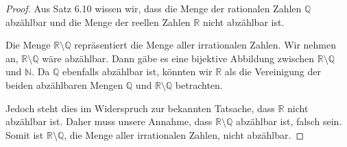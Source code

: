 \documentclass{article}
\theoremstyle{definition}
\theoremstyle{remark}
\begin{document}
\begin{proof}
	Aus Satz 6.10 wissen wir, dass die Menge der rationalen Zahlen \( \mathbb{Q} \) abzählbar und die Menge der reellen Zahlen \( \mathbb{R} \) nicht abzählbar ist.

	Die Menge \( \mathbb{R} \setminus \mathbb{Q} \) repräsentiert die Menge aller irrationalen Zahlen. Wir nehmen an, \( \mathbb{R} \setminus \mathbb{Q} \) wäre abzählbar. Dann gäbe es eine bijektive Abbildung zwischen \( \mathbb{R} \setminus \mathbb{Q} \) und \( \mathbb{N} \). Da \( \mathbb{Q} \) ebenfalls abzählbar ist, könnten wir \( \mathbb{R} \) als die Vereinigung der beiden abzählbaren Mengen \( \mathbb{Q} \) und \( \mathbb{R} \setminus \mathbb{Q} \) betrachten.

	Jedoch steht dies im Widerspruch zur bekannten Tatsache, dass \( \mathbb{R} \) nicht abzählbar ist. Daher muss unsere Annahme, dass \( \mathbb{R} \setminus \mathbb{Q} \) abzählbar ist, falsch sein. Somit ist \( \mathbb{R} \setminus \mathbb{Q} \), die Menge aller irrationalen Zahlen, nicht abzählbar.
\end{proof}
\end{document}
